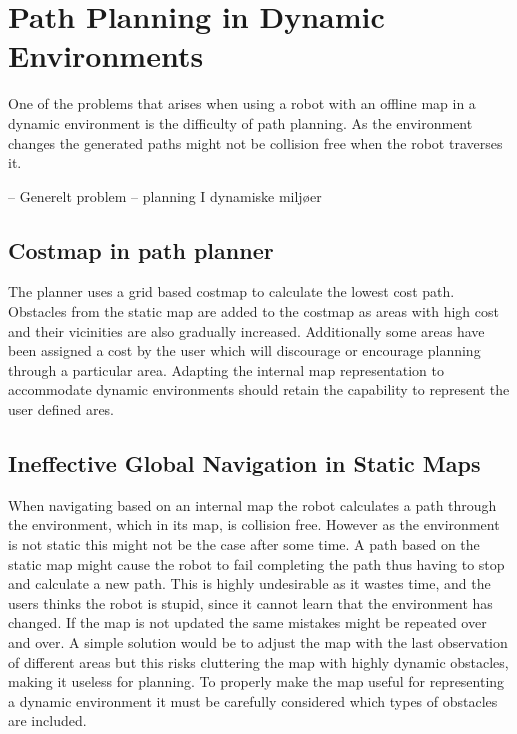 \section{Path Planning in Dynamic Environments}
One of the problems that arises when using a robot with an  offline map in a dynamic environment is the difficulty of path planning.
As the environment changes the generated paths might not be collision free when the robot traverses it. 

–	Generelt problem – planning I dynamiske miljøer

\subsection{Costmap in path planner}
The planner uses a grid based costmap to calculate the lowest cost path. Obstacles from the static map are added to the costmap as areas with high cost and their vicinities are also gradually increased. 
Additionally some areas have been assigned a cost by the user which will discourage or encourage planning through a particular area. 
Adapting the internal map representation to accommodate dynamic environments should retain the capability to represent the user defined ares.  

\subsection{Ineffective Global Navigation in Static Maps}
When navigating based on an internal map the robot calculates a path through the environment, which in its map, is collision free. 
However as the environment is not static this might not be the case after some time. 
A path based on the static map might cause the robot to fail completing the path thus having to stop and calculate a new path. 
This is highly undesirable as it wastes time, and the users thinks the robot is stupid, since it cannot learn that the environment has changed. 
If the map is not updated the same mistakes might be repeated over and over. 
A simple solution would be to adjust the map with the last observation of different areas but this risks cluttering the map with highly dynamic obstacles, making it useless for planning.
To properly make the map useful for representing a dynamic environment it must be carefully considered which types of obstacles are included. 